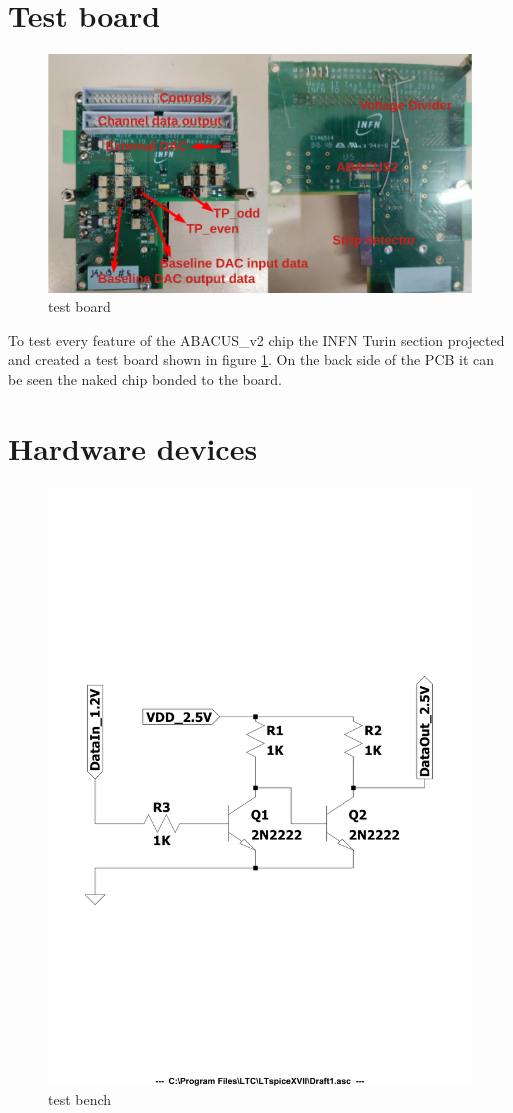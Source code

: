\section{Test board}\label{testboard}
\begin{figure}[H]
	\centering
	\includegraphics[width=0.7\linewidth]{IMG/ch5/TESTBOARD}
	\caption{test board}
	\label{fig:testboard}
\end{figure}
To test every feature of the ABACUS\_v2 chip the INFN Turin section projected and created a test board shown in figure \ref{fig:testboard}. On the back side of the PCB it can be seen the naked chip bonded to the board. 

\section{Hardware devices}\label{hardware}

\begin{figure}[H]
	\centering
	\includegraphics[width=0.7\linewidth]{IMG/ch5/DIAGRAM}
	\caption{test bench}
	\label{fig:diagram}
\end{figure}

